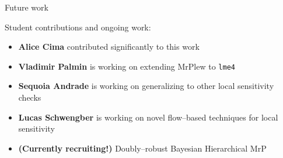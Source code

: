 \begin{frame}{Future work}

Student contributions and ongoing work:

\begin{itemize}
\item \textbf{Alice Cima} contributed significantly to this work
\item \textbf{Vladimir Palmin} is working on extending MrPlew to \texttt{lme4}
\item \textbf{Sequoia Andrade} is working on generalizing to other local sensitivity checks
\item \textbf{Lucas Schwengber} is working on novel flow--based techniques for local sensitivity
\item \textbf{(Currently recruiting!)} Doubly--robust Bayesian Hierarchical MrP
\end{itemize}



\end{frame}
